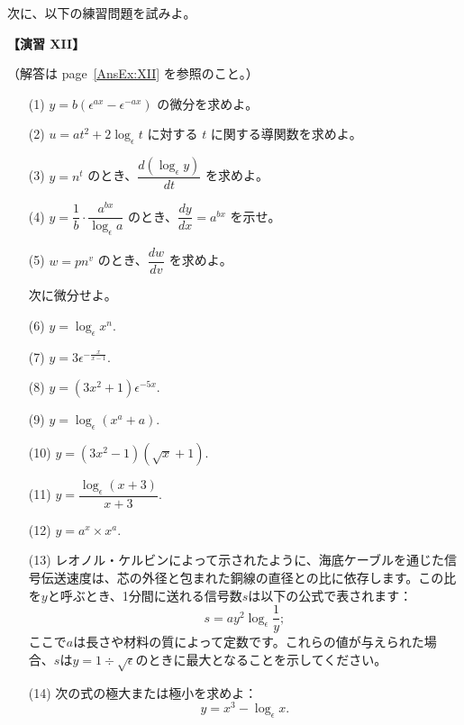 \documentclass[a4paper,11pt,openany]{ltjsbook}
\newcommand{\Pageref}[2][p.]{#1~\ref{#2}}
\begin{document}
次に、以下の練習問題を試みよ。

\par\textbf{【演習 XII】}\par （解答は \Pageref[page]{AnsEx:XII} を参照のこと。）

\begin{enumerate}
\item[(1)] \( y = b (\epsilon^{ax} - \epsilon^{-ax}) \) の微分を求めよ。

\item[(2)] \( u = at^2 + 2 \log_\epsilon t \) に対する \( t \) に関する導関数を求めよ。

\item[(3)] \( y = n^t \) のとき、\( \dfrac{d(\log_\epsilon y)}{dt} \) を求めよ。

\item[(4)] \( y = \dfrac{1}{b} \cdot \dfrac{a^{bx}}{\log_\epsilon a} \) のとき、\( \dfrac{dy}{dx} = a^{bx} \) を示せ。

\item[(5)] \( w = pn^v \) のとき、\( \dfrac{dw}{dv} \) を求めよ。

次に微分せよ。

\item[(6)] \( y = \log_\epsilon x^n \).

\item[(7)] \( y = 3 \epsilon^{-\frac{x}{x-1}} \).

\item[(8)] \( y = (3x^2 + 1) \epsilon^{-5x} \).
\item[(9)] \( y = \log_\epsilon (x^a + a) \).

\item[(10)] \( y = (3x^2 - 1)(\sqrt{x} + 1) \).

\item[(11)] \( y = \dfrac{\log_\epsilon (x+3)}{x+3} \).
\item[(12)] \( y = a^x \times x^a \).

\item[(13)] レオノル・ケルビンによって示されたように、海底ケーブルを通じた信号伝送速度は、芯の外径と包まれた銅線の直径との比に依存します。この比を$y$と呼ぶとき、1分間に送れる信号数$s$は以下の公式で表されます：
\[
s=ay^2 \log_\epsilon \frac{1}{y};
\]
ここで$a$は長さや材料の質によって定数です。これらの値が与えられた場合、$s$は$y=1 ÷ \sqrt{\epsilon}$のときに最大となることを示してください。

\item[(14)] 次の式の極大または極小を求めよ：
\[
y=x^3-\log_\epsilon x.
\]


\end{enumerate}
\end{document}
